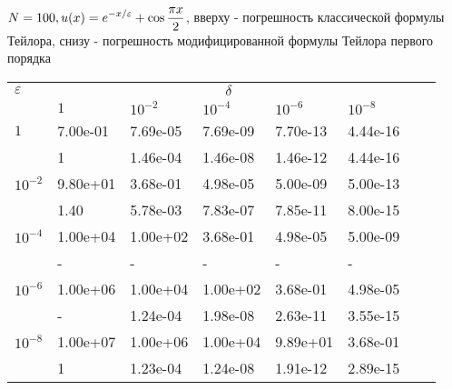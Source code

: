 \documentclass[10pt,twoside]{uz_kgu}
\begin{document}
	
	\begin{table}[!htb]
	$	{\label {tab:cub23}  N=100, \displaystyle u(x)=e^{-x /\varepsilon}+ \cos \frac{\pi x}{2} }$, вверху - погрешность классической формулы Тейлора, снизу - погрешность модифицированной формулы Тейлора первого порядка
		\begin{center}
			\begin{tabular}{|l|l|l|l|l|l|l|l|}
				\cline{1-6}  $\varepsilon$ & \multicolumn{5}{c|}{$\delta$}  \\
				\cline{2-6} &$1$ & $10^{-2}$ & $10^{-4}$  & $10^{-6}$& $10^{-8}$\\
				\cline{1-6}
				$1$
				&7.00e-01 &7.69e-05&7.69e-09&7.70e-13&4.44e-16\\
				&1 &1.46e-04 &1.46e-08 &1.46e-12&4.44e-16  \\
				\cline{1-6}
				$10^{-2}$
				&9.80e+01 &3.68e-01&4.98e-05&5.00e-09&5.00e-13\\
				&1.40         &5.78e-03&7.83e-07&7.85e-11 &8.00e-15 \\
				\cline{1-6}
				$10^{-4}$
				&1.00e+04 &1.00e+02&3.68e-01&4.98e-05&5.00e-09\\
				&-          &-         &-            &-             &-   \\
				\cline{1-6}
				$10^{-6}$
				&1.00e+06&1.00e+04&1.00e+02&3.68e-01&4.98e-05 \\
				&-         &1.24e-04 &1.98e-08&2.63e-11&3.55e-15 \\
				\cline{1-6}
				$10^{-8}$
				&1.00e+07  &1.00e+06   &1.00e+04   &9.89e+01&3.68e-01\\
				&1 &1.23e-04 &1.24e-08&1.91e-12&2.89e-15 \\
				\cline{1-6}
			\end{tabular}
		\end{center}
	\end{table}
	

		
		
	
\end{document}
